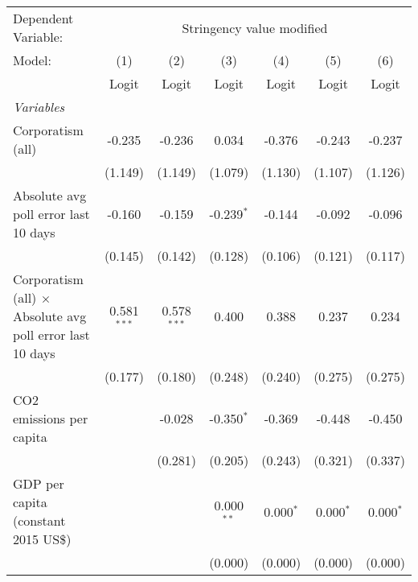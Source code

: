 
\begingroup
\centering
\begin{tabular}{lcccccc}
   \toprule
   Dependent Variable: & \multicolumn{6}{c}{Stringency value modified}\\
   Model:                                                           & (1)           & (2)           & (3)          & (4)         & (5)         & (6)\\  
                                                                    &  Logit        & Logit         & Logit        & Logit       & Logit       & Logit\\  
   \midrule
   \emph{Variables}\\
   Corporatism (all)                                                & -0.235        & -0.236        & 0.034        & -0.376      & -0.243      & -0.237\\   
                                                                    & (1.149)       & (1.149)       & (1.079)      & (1.130)     & (1.107)     & (1.126)\\   
   Absolute avg poll error last 10 days                             & -0.160        & -0.159        & -0.239$^{*}$ & -0.144      & -0.092      & -0.096\\   
                                                                    & (0.145)       & (0.142)       & (0.128)      & (0.106)     & (0.121)     & (0.117)\\   
   Corporatism (all) $\times$ Absolute avg poll error last 10 days  & 0.581$^{***}$ & 0.578$^{***}$ & 0.400        & 0.388       & 0.237       & 0.234\\   
                                                                    & (0.177)       & (0.180)       & (0.248)      & (0.240)     & (0.275)     & (0.275)\\   
   CO2 emissions per capita                                         &               & -0.028        & -0.350$^{*}$ & -0.369      & -0.448      & -0.450\\   
                                                                    &               & (0.281)       & (0.205)      & (0.243)     & (0.321)     & (0.337)\\   
   GDP per capita (constant 2015 US\$)                              &               &               & 0.000$^{**}$ & 0.000$^{*}$ & 0.000$^{*}$ & 0.000$^{*}$\\   
                                                                    &               &               & (0.000)      & (0.000)     & (0.000)     & (0.000)\\   

\end{tabular}
